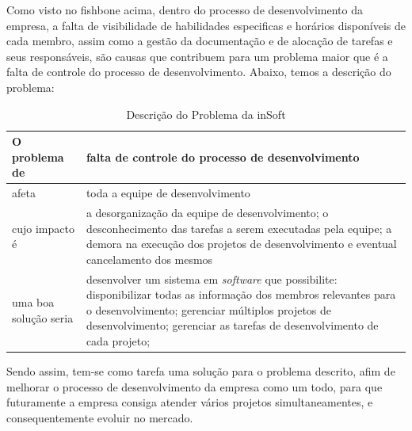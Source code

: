   Como visto no fishbone acima, dentro do processo de desenvolvimento da empresa, a falta de visibilidade de habilidades especificas e horários disponíveis de cada membro, assim como a gestão da documentação e de alocação de tarefas e seus responsáveis, são causas que contribuem para um problema maior que é a falta de controle do processo de desenvolvimento. Abaixo, temos a descrição do problema:


 
    \begin{table}[H]
        \centering
        \begin{tabular}{|>{\columncolor[HTML]{C0C0C0}}p{}|p{}|}
          \hline
          O problema de         &   falta de controle do processo de desenvolvimento \\ \hline
          afeta                 &   toda a equipe de desenvolvimento                 \\ \hline
          cujo impacto é        &   a desorganização da equipe de desenvolvimento;
                                    o desconhecimento das tarefas a serem executadas pela equipe;
                                    a demora na execução dos projetos de desenvolvimento e eventual cancelamento dos mesmos                                         \\ \hline
          uma boa solução seria &   desenvolver um sistema em \emph{software} que possibilite:
                                    disponibilizar todas as informação dos membros relevantes para o desenvolvimento;
                                    gerenciar múltiplos projetos de desenvolvimento;
                                    gerenciar as tarefas de desenvolvimento de cada projeto;
                                    \\ \hline
        \end{tabular}
        \caption{Descrição do Problema da inSoft}
      \end{table}



      Sendo assim, tem-se como tarefa uma solução para o problema descrito, afim de melhorar o processo de desenvolvimento da empresa como um todo, para que futuramente a empresa consiga atender vários projetos simultaneamentes, e consequentemente evoluir no mercado.




